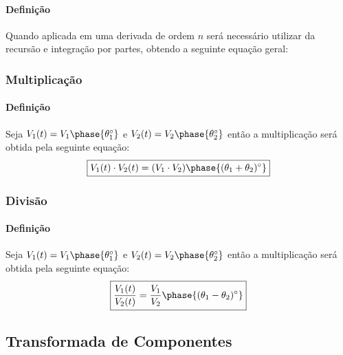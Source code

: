 \documentclass{article}
\begin{document}
                \paragraph{Definição}Quando aplicada em uma derivada de ordem $n$ será necessário utilizar da recursão e integração por partes, obtendo a seguinte equação geral:
        \begin{multicols}{2}
            \raggedcolumns
            \subsubsection{Multiplicação}
                \paragraph{Definição}Seja $V_{1}(t) = V_{1} \phase{\theta_{1}^{\circ}}$ e $V_{2}(t) = V_{2} \phase{\theta_{2}^{\circ}}$ então a multiplicação será obtida pela seguinte equação:
                    \begin{equation}
                        \boxed{
                            V_{1}(t) \cdot V_{2}(t) = 
                            (V_{1} \cdot V_{2})\phase{(\theta_{1} + \theta_{2})^{\circ}}
                        }
                    \end{equation}

            \columnbreak

            \subsubsection{Divisão}
                \paragraph{Definição}Seja $V_{1}(t) = V_{1} \phase{\theta_{1}^{\circ}}$ e $V_{2}(t) = V_{2} \phase{\theta_{2}^{\circ}}$ então a multiplicação será obtida pela seguinte equação:
                    \begin{equation}
                        \boxed{
                            \frac{V_{1}(t)}{V_{2}(t)} = 
                            \frac{V_{1}}{V_{2}} \phase{(\theta_{1} - \theta_{2})^{\circ}}
                        }
                    \end{equation}
        \end{multicols}

    \subsection{Transformada de Componentes}
\end{document}
